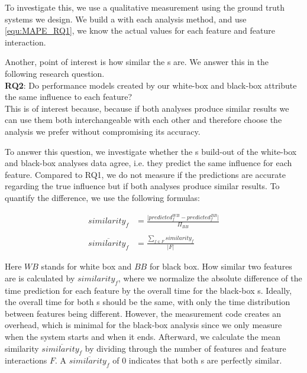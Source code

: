 To investigate this, we use a qualitative measurement using the ground truth systems we design. 
We build a {\perfInfluenceModel} with each analysis method, and use \autoref{equ:MAPE_RQ1},
we know the actual values for each feature and feature interaction.

Another, point of interest is how similar the {\perfInfluenceModel}s are. We answer this in the following research question.\\

\noindent \textbf{RQ2}: Do performance models created by our white-box and black-box attribute the same influence to each feature?\\

This is of interest because, because if both analyses produce similar results we can use them both interchangeable with each other and 
therefore choose the analysis we prefer without compromising its accuracy.

To answer this question, we investigate whether the {\perfInfluenceModel}s build-out of the white-box and black-box analyses data agree, i.e.
they predict the same influence for each feature. 
Compared to RQ1, we do not measure if the predictions are accurate regarding the true influence but if both analyses produce similar results. 
To quantify the difference, we use the following formulas:

\begin{align}
    similarity_f &= \frac{\lvert predicted^{WB}_{f} - predicted^{BB}_{f} \rvert}{\Pi_{BB}} \label{equ:APE_RQ1} \\ \nonumber \\
    \overline{similarity_f}  &=  \frac{\sum_{f \in F} similarity_f}{\lvert F \rvert} \label{equ:MAPE_RQ1}
\end{align}

Here $WB$ stands for white box and $BB$ for black box. How similar two features are is calculated by $similarity_f$, 
where we normalize the absolute difference of the time prediction for each feature by the overall time for the black-box {\perfInfluenceModel}s. 
Ideally, the overall time for both {\perfInfluenceModel}s should be the same, with only the time distribution between features being different. 
However, the measurement code creates an overhead, which is minimal for the black-box analysis since we only measure when the system starts and when it ends.
Afterward, we calculate the mean similarity $\overline{similarity_f}$ by dividing through the number of features and feature interactions $F$. 
A $\overline{similarity_f}$ of 0 indicates that both {\perfInfluenceModel}s are perfectly similar.

